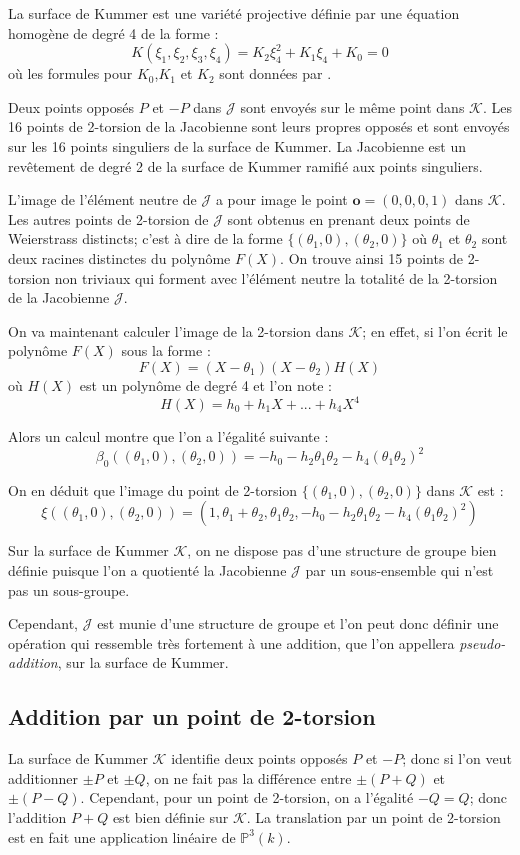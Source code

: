 \documentclass[a4paper]{article}
\theoremstyle{definition}
\theoremstyle{remark}
\numberwithin{equation}{section}
\begin{document}
La surface de Kummer est une variété projective définie par une équation homogène de degré 4 de la forme :
$$K(\xi_1,\xi_2,\xi_3,\xi_4)=K_2\xi_4^2 + K_1\xi_4 + K_0 = 0$$
où les formules pour $K_0$,$K_1$ et $K_2$ sont données par \citet{eqKum}.

Deux points opposés $P$ et $-P$ dans $\mathcal{J}$ sont envoyés sur le même point dans $\mathcal{K}$. Les 16 points de 2-torsion de la Jacobienne sont leurs propres opposés et sont envoyés sur les 16 points singuliers de la surface de Kummer. La Jacobienne est un revêtement de degré 2 de la surface de Kummer ramifié aux points singuliers.

L'image de l'élément neutre de $\mathcal{J}$ a pour image le point $\mathbf{o} = (0,0,0,1)$ dans $\mathcal{K}$. Les autres points de 2-torsion de $\mathcal{J}$ sont obtenus en prenant deux points de Weierstrass distincts; c'est à dire de la forme $\{(\theta_1,0),(\theta_2,0)\}$ où $\theta_1$ et $\theta_2$ sont deux racines distinctes du polynôme $F(X)$. On trouve ainsi 15 points de 2-torsion non triviaux qui forment avec l'élément neutre la totalité de la 2-torsion de la Jacobienne $\mathcal{J}$.

On va maintenant calculer l'image de la 2-torsion dans $\mathcal{K}$; en effet, si l'on écrit le polynôme $F(X)$ sous la forme :
$$F(X) = (X-\theta_1)(X-\theta_2)H(X)$$
où $H(X)$ est un polynôme de degré 4 et l'on note :
$$H(X) = h_0 + h_1X + ... + h_4X^4$$

Alors un calcul montre que l'on a l'égalité suivante :
$$\beta_0((\theta_1,0),(\theta_2,0)) = -h_0 -h_2\theta_1\theta_2 - h_4(\theta_1\theta_2)^2$$

On en déduit que l'image du point de 2-torsion $\{(\theta_1,0),(\theta_2,0)\}$ dans $\mathcal{K}$ est :
$$\xi((\theta_1,0),(\theta_2,0)) = (1,\theta_1+\theta_2,\theta_1\theta_2, -h_0 -h_2\theta_1\theta_2 - h_4(\theta_1\theta_2)^2)$$

Sur la surface de Kummer $\mathcal{K}$, on ne dispose pas d'une structure de groupe bien définie puisque l'on a quotienté la Jacobienne $\mathcal{J}$ par un sous-ensemble qui n'est pas un sous-groupe.

Cependant, $\mathcal{J}$ est munie d'une structure de groupe et l'on peut donc définir une opération qui ressemble très fortement à une addition, que l'on appellera \emph{pseudo-addition}, sur la surface de Kummer.

\subsection{Addition par un point de 2-torsion}
\label{add2tors}
La surface de Kummer $\mathcal{K}$ identifie deux points opposés $P$ et $-P$; donc si l'on veut additionner $\pm P$ et $\pm Q$, on ne fait pas la différence entre $\pm (P+Q)$ et $\pm (P-Q)$. Cependant, pour un point de 2-torsion, on a l'égalité $-Q=Q$; donc l'addition $P+Q$ est bien définie sur $\mathcal{K}$. La translation par un point de 2-torsion est en fait une application linéaire de $\mathbb{P}^3(k)$.
\end{document}

